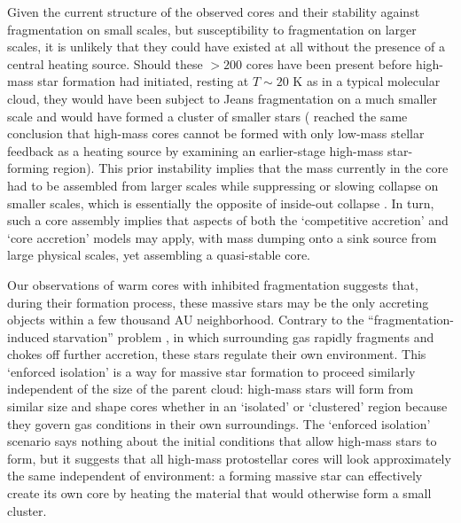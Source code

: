 \documentclass[twocolumn]{aastex61}
\begin{document}
Given the current structure of the observed cores and their stability against
fragmentation on small scales, but susceptibility to fragmentation on larger
scales, it is unlikely that they could have existed at all without the presence
of a central heating source.  Should these $>200$ \msun cores have been present
before high-mass star formation had initiated, resting at $T\sim20$ K as in a
typical molecular cloud, they would have been subject to Jeans fragmentation on
a much smaller scale and would have formed a cluster of smaller stars
(\citet{Longmore2011a} reached the same conclusion that high-mass cores cannot
be formed with only low-mass stellar feedback as a heating source by examining
an earlier-stage high-mass star-forming region).  This prior instability
implies that the mass currently in the core had to be assembled from larger
scales while suppressing or slowing collapse on smaller scales, which is
essentially the opposite of inside-out collapse \citep{Naranjo-Romero2015a}.
In turn, such a core assembly implies that aspects of both the `competitive
accretion' and `core accretion' models may apply, with mass dumping onto a sink
source from large physical scales, yet assembling a quasi-stable core.


Our observations of warm cores with inhibited fragmentation suggests that,
during their formation process, these massive stars may be the only accreting
objects within a few thousand AU neighborhood.  Contrary to the
``fragmentation-induced starvation'' problem
\citep{Peters2010a,Peters2010c,Girichidis2012b}, in which surrounding gas
rapidly fragments and chokes off further accretion, these stars regulate their
own environment.  This `enforced isolation' is a way for massive
star formation to proceed similarly independent of the size of the parent
cloud: high-mass stars will form from similar size and shape cores whether in
an `isolated' or `clustered' region because they govern gas conditions in their
own surroundings.  The `enforced isolation' scenario says nothing about the
initial conditions that allow high-mass stars to form, but it suggests that all
high-mass protostellar cores will look approximately the same independent of
environment: a forming massive star can effectively create its own core by
heating the material that would otherwise form a small cluster.
\end{document}
